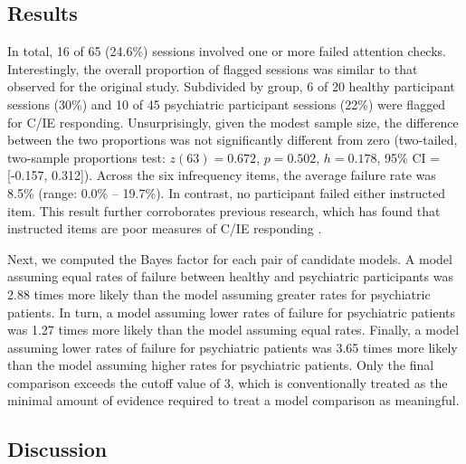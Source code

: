 \documentclass[a4paper,notitlepage,12pt]{article}
\begin{document}
\begin{refsection}[supp]
\subsection*{Results}

In total, 16 of 65 (24.6\%) sessions involved one or more failed attention checks. Interestingly, the overall proportion of flagged sessions was similar to that observed for the original study. Subdivided by group, 6 of 20 healthy participant sessions (30\%) and 10 of 45 psychiatric participant sessions (22\%) were flagged for C/IE responding. Unsurprisingly, given the modest sample size, the difference between the two proportions was not significantly different from zero (two-tailed, two-sample proportions test: $z(63)=0.672$, $p=0.502$, $h=0.178$, 95\% CI = [-0.157, 0.312]). Across the six infrequency items, the average failure rate was 8.5\% (range: 0.0\% -- 19.7\%). In contrast, no participant failed either instructed item. This result further corroborates previous research, which has found that instructed items are poor measures of C/IE responding \cite{barends2019noncompliant-2, thomas2017validity-2, hauser2016attentive-2}.   

Next, we computed the Bayes factor for each pair of candidate models. A model assuming equal rates of failure between healthy and psychiatric participants was 2.88 times more likely than the model assuming greater rates for psychiatric patients. In turn, a model assuming lower rates of failure for psychiatric patients was 1.27 times more likely than the model assuming equal rates. Finally, a model assuming lower rates of failure for psychiatric patients was 3.65 times more likely than the model assuming higher rates for psychiatric patients. Only the final comparison exceeds the cutoff value of 3, which is conventionally treated as the minimal amount of evidence required to treat a model comparison as meaningful.  

\subsection*{Discussion}


\end{refsection}
\end{document}
